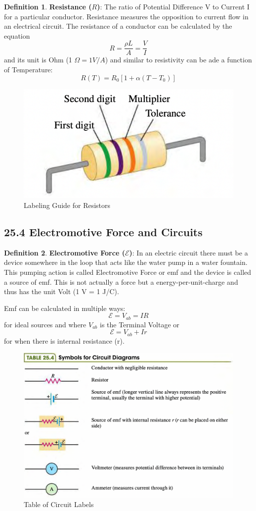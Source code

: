 \documentclass[12pt]{amsart}
\theoremstyle{definition}
\newtheorem{definition}{Definition} %
\numberwithin{equation}{theorem}    %
\begin{document}
\begin{definition}
    \textbf{Resistance ($R$)}:
    The ratio of Potential Difference V to Current I for a particular conductor.
    Resistance measures the opposition to current flow in an electrical circuit.
    The resistance of a conductor can be calculated by the equation
    $$R = \frac{\rho L}{A} = \frac{V}{I}$$ and its unit is Ohm (1 $\Omega = 1V/A$)
    and similar to resistivity can be ade a function of Temperature:
    $$R(T) = R_0[1+\alpha(T-T_0)]$$
\end{definition}

\begin{figure}[H]
    \centering
    \includegraphics[width=5in]{Media/Resistor.png}
    \caption{Labeling Guide for Resistors}
    \label{Labeling Guide for Resistors}
\end{figure}

\subsection*{25.4 Electromotive Force and Circuits}

\begin{definition}
    \textbf{Electromotive Force ($\mathcal{E}$)}:
    In an electric circuit there must be a device somewhere in the loop that 
    acts like the water pump in a water fountain. This pumping action is called 
    Electromotive Force or emf and the device is called a source of emf. This is not actually
    a force but a energy-per-unit-charge and thus has the unit Volt (1 V = 1 J/C).

    Emf can be calculated in multiple ways:
    $$\mathcal{E} = V_{ab} = IR $$ for ideal sources and where $V_{ab}$ is the Terminal Voltage
    or $$\mathcal{E} = V_{ab} + Ir$$ for when there is internal resistance (r).
\end{definition}

\begin{figure}[H]
    \centering
    \includegraphics[width=5in]{Media/Circuit.png}
    \caption{Table of Circuit Labels}
    \label{Table of Circuit Labels}
\end{figure}
\end{document}
